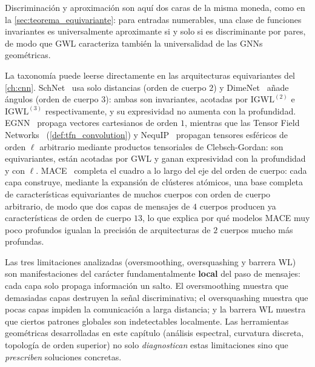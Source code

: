 Discriminación y aproximación son aquí dos caras de la misma moneda, como en la \autoref{sec:teorema_equivariante}: para entradas numerables, una clase de funciones invariantes es universalmente aproximante si y solo si es discriminante por pares, de modo que GWL caracteriza también la universalidad de las \glspl{GNN} geométricas.

\begin{remark}\label{rem:gwl_arquitecturas}
	La taxonomía puede leerse directamente en las arquitecturas equivariantes del \autoref{ch:cnn}. SchNet~\citep{schutt2017schnet} usa solo distancias (orden de cuerpo $2$) y DimeNet~\citep{gasteiger2020dimenet} añade ángulos (orden de cuerpo $3$): ambas son invariantes, acotadas por $\mathrm{IGWL}^{(2)}$ e $\mathrm{IGWL}^{(3)}$ respectivamente, y su expresividad no aumenta con la profundidad. EGNN~\citep{satorras2021enequivariant} propaga vectores cartesianos de orden $1$, mientras que las Tensor Field Networks~\citep{thomas2018tensorfieldnetworks} (\autoref{def:tfn_convolution}) y NequIP~\citep{batzner2022nequip} propagan tensores esféricos de orden $\ell$ arbitrario mediante productos tensoriales de Clebsch-Gordan: son equivariantes, están acotadas por GWL y ganan expresividad con la profundidad y con $\ell$. MACE~\citep{batatia2022mace} completa el cuadro a lo largo del eje del orden de cuerpo: cada capa construye, mediante la expansión de clústeres atómicos, una base completa de características equivariantes de muchos cuerpos con orden de cuerpo arbitrario, de modo que dos capas de mensajes de $4$ cuerpos producen ya características de orden de cuerpo $13$, lo que explica por qué modelos MACE muy poco profundos igualan la precisión de arquitecturas de $2$ cuerpos mucho más profundas.
\end{remark}

\medskip

Las tres limitaciones analizadas (\gls{oversmoothing}, \gls{oversquashing} y barrera WL) son manifestaciones del carácter fundamentalmente \textbf{local} del paso de mensajes: cada capa solo propaga información un salto. El \gls{oversmoothing} muestra que demasiadas capas destruyen la señal discriminativa; el \gls{oversquashing} muestra que pocas capas impiden la comunicación a larga distancia; y la barrera WL muestra que ciertos patrones globales son indetectables localmente. Las herramientas geométricas desarrolladas en este capítulo (análisis espectral, curvatura discreta, topología de orden superior) no solo \textit{diagnostican} estas limitaciones sino que \textit{prescriben} soluciones concretas.

